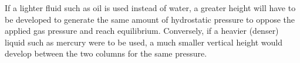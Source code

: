 If a lighter fluid such as oil is used instead of water, a greater height will have to be developed to generate the same amount of hydrostatic pressure to oppose the applied gas pressure and reach equilibrium.  Conversely, if a heavier (denser) liquid such as mercury were to be used, a much smaller vertical height would develop between the two columns for the same pressure.











